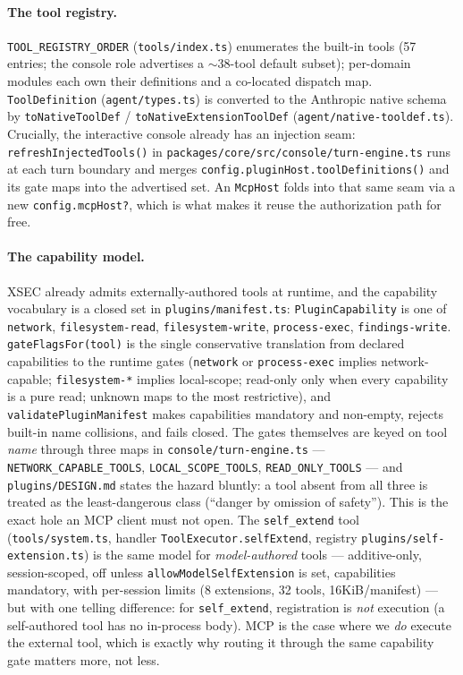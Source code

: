 \documentclass[11pt]{article}
\begin{document}
\paragraph{The tool registry.} \texttt{TOOL\_REGISTRY\_ORDER}
(\texttt{tools/index.ts}) enumerates the built-in tools (57 entries; the console
role advertises a $\sim$38-tool default subset); per-domain modules each own
their definitions and a co-located dispatch map. \texttt{ToolDefinition}
(\texttt{agent/types.ts}) is converted to the Anthropic native schema by
\texttt{toNativeToolDef} / \texttt{toNativeExtensionToolDef}
(\texttt{agent/native-tooldef.ts}). Crucially, the interactive console already
has an injection seam: \texttt{refreshInjectedTools()} in
\texttt{packages/core/src/console/turn-engine.ts} runs at each turn boundary and
merges \texttt{config.pluginHost.toolDefinitions()} and its gate maps into the
advertised set. An \texttt{McpHost} folds into that same seam via a new
\texttt{config.mcpHost?}, which is what makes it reuse the authorization path for
free.

\paragraph{The capability model.} XSEC already admits externally-authored tools
at runtime, and the capability vocabulary is a closed set in
\texttt{plugins/manifest.ts}: \texttt{PluginCapability} is one of
\texttt{network}, \texttt{filesystem-read}, \texttt{filesystem-write},
\texttt{process-exec}, \texttt{findings-write}. \texttt{gateFlagsFor(tool)} is the
single conservative translation from declared capabilities to the runtime gates
(\texttt{network} or \texttt{process-exec} implies network-capable;
\texttt{filesystem-*} implies local-scope; read-only only when every capability
is a pure read; unknown maps to the most restrictive), and
\texttt{validatePluginManifest} makes capabilities mandatory and non-empty,
rejects built-in name collisions, and fails closed. The gates themselves are
keyed on tool \emph{name} through three maps in
\texttt{console/turn-engine.ts} --- \texttt{NETWORK\_CAPABLE\_TOOLS},
\texttt{LOCAL\_SCOPE\_TOOLS}, \texttt{READ\_ONLY\_TOOLS} --- and
\texttt{plugins/DESIGN.md} states the hazard bluntly: a tool absent from all
three is treated as the least-dangerous class (``danger by omission of
safety''). This is the exact hole an MCP client must not open. The
\texttt{self\_extend} tool (\texttt{tools/system.ts}, handler
\texttt{ToolExecutor.selfExtend}, registry \texttt{plugins/self-extension.ts}) is
the same model for \emph{model-authored} tools --- additive-only, session-scoped,
off unless \texttt{allowModelSelfExtension} is set, capabilities mandatory, with
per-session limits (8 extensions, 32 tools, 16KiB/manifest) --- but with one
telling difference: for \texttt{self\_extend}, registration is \emph{not}
execution (a self-authored tool has no in-process body). MCP is the case where we
\emph{do} execute the external tool, which is exactly why routing it through the
same capability gate matters more, not less.
\end{document}
